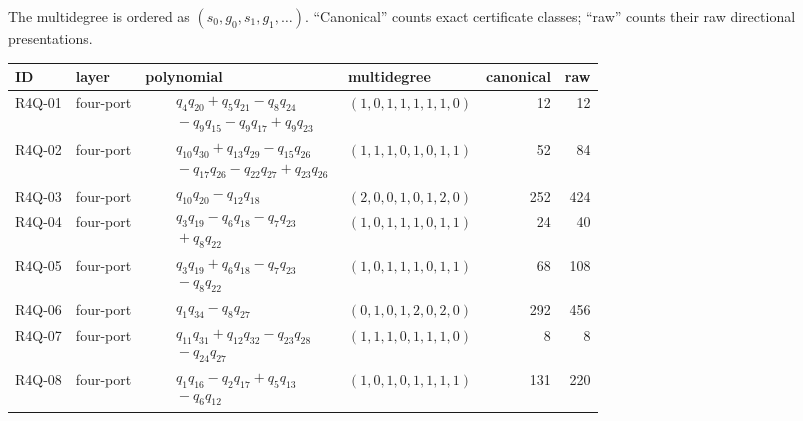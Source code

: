 The multidegree is ordered as
$(s_0,g_0,s_1,g_1,\ldots)$.  ``Canonical'' counts exact certificate classes;
``raw'' counts their raw directional presentations.

\begingroup\scriptsize
\begin{longtable}{l L{.16\linewidth} L{.34\linewidth} L{.18\linewidth} r r}
\toprule ID & layer & polynomial & multidegree & canonical & raw\\\midrule\endhead
R4Q-01 & four-port & $\begin{aligned}&\quad q_{4}q_{20}+q_{5}q_{21}-q_{8}q_{24}\\&\quad -q_{9}q_{15}-q_{9}q_{17}+q_{9}q_{23}\end{aligned}$ & $(1,0,1,1,1,1,1,0)$ & 12 & 12\\
R4Q-02 & four-port & $\begin{aligned}&\quad q_{10}q_{30}+q_{13}q_{29}-q_{15}q_{26}\\&\quad -q_{17}q_{26}-q_{22}q_{27}+q_{23}q_{26}\end{aligned}$ & $(1,1,1,0,1,0,1,1)$ & 52 & 84\\
R4Q-03 & four-port & $\begin{aligned}&\quad q_{10}q_{20}-q_{12}q_{18}\end{aligned}$ & $(2,0,0,1,0,1,2,0)$ & 252 & 424\\
R4Q-04 & four-port & $\begin{aligned}&\quad q_{3}q_{19}-q_{6}q_{18}-q_{7}q_{23}\\&\quad +q_{8}q_{22}\end{aligned}$ & $(1,0,1,1,1,0,1,1)$ & 24 & 40\\
R4Q-05 & four-port & $\begin{aligned}&\quad q_{3}q_{19}+q_{6}q_{18}-q_{7}q_{23}\\&\quad -q_{8}q_{22}\end{aligned}$ & $(1,0,1,1,1,0,1,1)$ & 68 & 108\\
R4Q-06 & four-port & $\begin{aligned}&\quad q_{1}q_{34}-q_{8}q_{27}\end{aligned}$ & $(0,1,0,1,2,0,2,0)$ & 292 & 456\\
R4Q-07 & four-port & $\begin{aligned}&\quad q_{11}q_{31}+q_{12}q_{32}-q_{23}q_{28}\\&\quad -q_{24}q_{27}\end{aligned}$ & $(1,1,1,0,1,1,1,0)$ & 8 & 8\\
R4Q-08 & four-port & $\begin{aligned}&\quad q_{1}q_{16}-q_{2}q_{17}+q_{5}q_{13}\\&\quad -q_{6}q_{12}\end{aligned}$ & $(1,0,1,0,1,1,1,1)$ & 131 & 220\\

\end{longtable}

